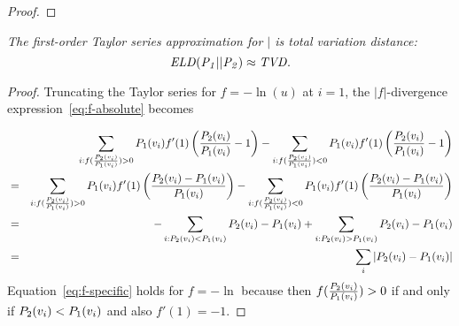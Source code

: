 {\begin{proof}
\end{proof}

{\em The first-order Taylor series approximation for $\mid$ is total variation distance:
$$\it{ELD}(P_{1}||P_{2}) \approx  TVD. $$}

\begin{proof}
Truncating the Taylor series for $f=-\ln(u)$ at $i=1$, the $|f|$-divergence expression~\ref{eq:f-absolute} becomes 

\begin{eqnarray}
& & \sum_{i:f(\frac{P_{2}(v_{i})}{P_{1}(v_{i})})>0} P_{1}(v_{i}) f'(1) \left(\frac{P_{2}(v_{i})}{P_{1}(v_{i})}-1\right) -  \sum_{i:f(\frac{P_{2}(v_{i})}{P_{1}(v_{i})})<0} P_{1}(v_{i}) f'(1) \left(\frac{P_{2}(v_{i})}{P_{1}(v_{i})}-1\right) \notag \\
& = &\sum_{i:f(\frac{P_{2}(v_{i})}{P_{1}(v_{i})})>0} P_{1}(v_{i}) f'(1) \left(\frac{P_{2}(v_{i})-P_{1}(v_{i})}{P_{1}(v_{i})}\right) - \sum_{i:f(\frac{P_{2}(v_{i})}{P_{1}(v_{i})})<0} P_{1}(v_{i}) f'(1) \left(\frac{P_{2}(v_{i})-P_{1}(v_{i})}{P_{1}(v_{i})}\right) \notag \\
 & = & 
- \sum_{i:P_{2}(v_{i})<P_{1}(v_{i})}
P_{2}(v_{i})-P_{1}(v_{i}) + \sum_{i:P_{2}(v_{i})>P_{1}(v_{i})}
 P_{2}(v_{i})-P_{1}(v_{i}) \label{eq:f-specific}
 \\
& = &   \sum_{i} |P_{2}(v_{i})-P_{1}(v_{i}) | \notag
\end{eqnarray}
Equation~\eqref{eq:f-specific} holds for $f = -\ln$ because then $f(\frac{P_{2}(v_{i})}{P_{1}(v_{i})})>0$ if and only if $P_{2}(v_{i}) < P_{1}(v_{i})$ and also $f'(1) = -1$.
\end{proof}




%
%
%
%
%


}
